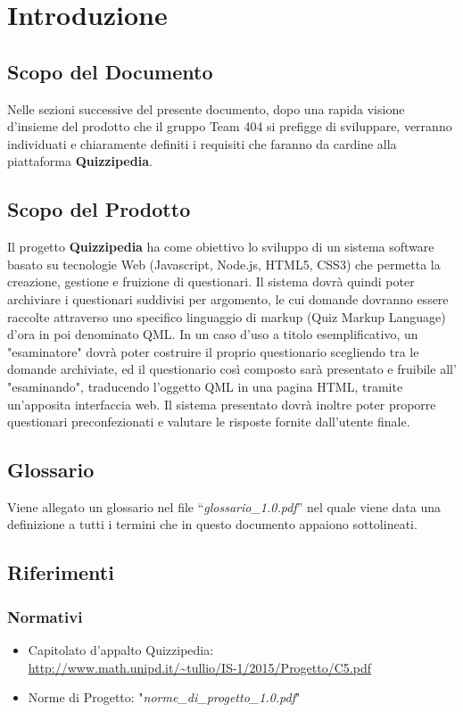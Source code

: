 \documentclass[a4paper,11pt]{article}
\begin{document}
	\newpage
	\section{Introduzione}
	\subsection{Scopo del Documento}
	Nelle sezioni successive del presente documento, dopo una rapida visione d'insieme del prodotto che il gruppo Team 404 si prefigge di sviluppare, verranno individuati e chiaramente definiti i requisiti che faranno da cardine alla piattaforma \textbf{Quizzipedia}.
	\subsection{Scopo del Prodotto}
	Il progetto \textbf{Quizzipedia} ha come obiettivo lo sviluppo di un sistema software basato su tecnologie Web (Javascript, Node.js, HTML5, CSS3) che permetta la creazione, gestione e fruizione di questionari. Il sistema dovrà quindi poter archiviare i questionari suddivisi per argomento, le cui domande dovranno essere raccolte attraverso uno specifico linguaggio di markup (Quiz Markup Language) d'ora in poi denominato QML. In un caso d'uso a titolo esemplificativo, un "esaminatore" dovrà poter costruire il proprio questionario scegliendo tra le domande archiviate, ed il questionario così composto sarà presentato e fruibile all' "esaminando", traducendo l'oggetto QML in una pagina HTML, tramite un'apposita interfaccia web. Il sistema presentato dovrà inoltre poter proporre questionari preconfezionati e valutare le risposte fornite dall'utente finale.
	\subsection{Glossario}
	Viene allegato un glossario nel file ``\textit{glossario\_1.0.pdf}'' nel quale viene data una definizione a tutti i termini che in questo documento appaiono sottolineati.
	\subsection{Riferimenti}
		\subsubsection{Normativi}
		\begin{itemize}
			\item Capitolato d'appalto Quizzipedia:\\
			\url{http://www.math.unipd.it/~tullio/IS-1/2015/Progetto/C5.pdf}
			\item Norme di Progetto: "\textit{norme\_di\_progetto\_1.0.pdf}"
		\end{itemize}
\end{document}
